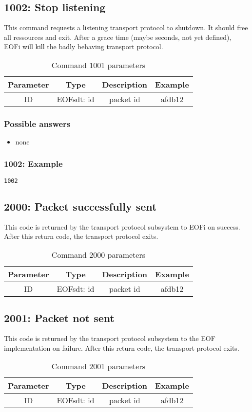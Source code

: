 \documentclass[12pt,a4paper]{book}
\begin{document}
\subsection{1002: Stop listening}
%
This command requests a listening transport protocol to 
shutdown. It should free all ressources and exit.
After a grace time (maybe seconds, not yet defined), EOFi will kill the badly
behaving transport protocol.
\begin{longtable}{|c|c|c|c|}
\caption{Command 1001 parameters}\\
\hline
\textbf{Parameter} & \textbf{Type} & \textbf{Description} & \textbf{Example}\\
\hline
ID & EOFsdt: id & packet id & afdb12\\
\hline
\end{longtable}
\subsubsection{Possible answers}
\begin{itemize}
\item none
\end{itemize}
\subsubsection{1002: Example}
\begin{verbatim}
1002
\end{verbatim}
\subsection{2000: Packet successfully sent}
This code is returned by the transport protocol subsystem to EOFi on success.
After this return code, the transport protocol exits.
\begin{longtable}{|c|c|c|c|}
\caption{Command 2000 parameters}\\
\hline
\textbf{Parameter} & \textbf{Type} & \textbf{Description} & \textbf{Example}\\
\hline
ID & EOFsdt: id & packet id & afdb12\\
\hline
\end{longtable}
\subsection{2001: Packet not sent}
This code is returned by the transport protocol subsystem to the
EOF implementation on failure.
After this return code, the transport protocol exits.
\begin{longtable}{|c|c|c|c|}
\caption{Command 2001 parameters}\\
\hline
\textbf{Parameter} & \textbf{Type} & \textbf{Description} & \textbf{Example}\\
\hline
ID & EOFsdt: id & packet id & afdb12\\
\hline
\end{longtable}
\end{document}
